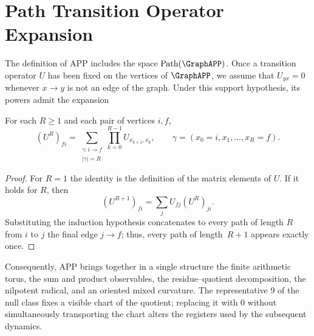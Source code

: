 \section{Path Transition Operator Expansion}

The definition of APP includes the space
\(\operatorname{Path}(\GraphAPP)\). Once a transition operator
\(U\) has been fixed on the vertices of \(\GraphAPP\), we assume that
\(U_{yx}=0\) whenever \(x\to y\) is not an edge of the graph. Under this
support hypothesis, its powers admit the expansion
\begin{proposition}
\label{prop:app-suma-caminos}
For each \(R\ge1\) and each pair of vertices \(i,f\),
\[
(U^R)_{fi}
=\sum_{\substack{\gamma:i\to f\\|\gamma|=R}}
\prod_{k=0}^{R-1}U_{x_{k+1},x_k},
\qquad
\gamma=(x_0=i,x_1,\ldots,x_R=f).
\]
\end{proposition}

\begin{proof}
For \(R=1\) the identity is the definition of the matrix elements of
\(U\). If it holds for \(R\), then
\[
 (U^{R+1})_{fi}
 =\sum_j U_{fj}(U^R)_{ji}.
\]
Substituting the induction hypothesis concatenates to every path of length \(R\)
from \(i\) to \(j\) the final edge \(j\to f\); thus, every path of
length~\(R+1\) appears exactly once.\qedhere
\end{proof}

Consequently, APP brings together in a single structure the finite arithmetic torus,
the sum and product observables, the residue--quotient decomposition, the
nilpotent radical, and an oriented mixed curvature. The representative \(9\) of
the null class fixes a visible chart of the quotient; replacing it with \(0\) without
simultaneously transporting the chart alters the registers used by the
subsequent dynamics.
\fi
